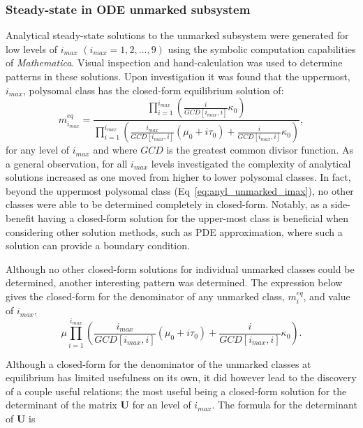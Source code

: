 \documentclass[review]{elsarticle}
\let\bs\boldsymbol
\begin{document}
\subsubsection{Steady-state in ODE unmarked subsystem}
Analytical steady-state solutions to the unmarked subsystem were generated for low levels of $i_{max}$ $(i_{max}=1,2,...,9)$ using the symbolic computation capabilities of \emph{Mathematica}.  Visual inspection and hand-calculation was used to determine patterns in these solutions.  Upon investigation it was found that the uppermost, $i_{max}$, polysomal class has the closed-form equilibrium solution of:
\begin{equation}\label{eq:anyl_unmarked_imax}
m_{i_{max}}^{eq}=\dfrac{\prod_{i=1}^{i_{max}}\left(\frac{i}{GCD[i_{max},i]}\kappa_0\right)}{\prod_{i=1}^{i_{max}}\left(\frac{i_{max}}{GCD[i_{max},i]}(\mu_0+i\tau_0)+\frac{i}{GCD[i_{max},i]}\kappa_0\right)},
\end{equation}
for any level of $i_{max}$ and where $GCD$ is the greatest common divisor function.  As a general observation, for all $i_{max}$ levels investigated the complexity of analytical solutions increased as one moved from higher to lower polysomal classes. In fact, beyond the uppermost polysomal class (Eq~\ref{eq:anyl_unmarked_imax}), no other classes were able to be determined completely in closed-form.  Notably, as a side-benefit having a closed-form solution for the upper-most class is beneficial when considering other solution methods, such as PDE approximation, where such a solution can provide a boundary condition.

Although no other closed-form solutions for individual unmarked classes could be determined, another interesting pattern was determined.  The expression below gives the closed-form for the denominator of any unmarked class, $m_i^{eq}$, and value of $i_{max}$,
\begin{equation*}\label{eq:anyl_unmarked_denom}
\mu\prod_{i=1}^{i_{max}}\left(\frac{i_{max}}{GCD[i_{max},i]}(\mu_0+i\tau_0)+\frac{i}{GCD[i_{max},i]}\kappa_0\right).
\end{equation*}

Although a closed-form for the denominator of the unmarked classes at equilibrium has limited usefulness on its own, it did however lead to the discovery of a couple useful relations; the most useful being a closed-form solution for the determinant of the matrix $\bs{U}$ for an level of $i_{max}$.  The formula for the determinant of $\bs{U}$ is
\end{document}
